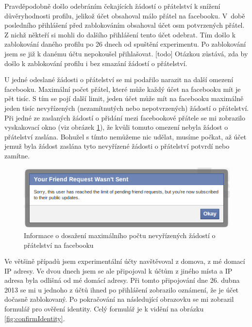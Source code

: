 \documentclass[thesis=M,czech]{FITthesis}[2013/05/10]
\begin{document}
Pravděpodobně došlo odebráním čekajících žádostí o přátelství k snížení důvěryhodnosti profilu, jelikož účet obsahoval málo přátel na facebooku. V~době posledního přihlášení před zablokováním obsahoval účet osm potvrzených přátel. Z nichž někteří si mohli do dalšího přihlášení tento účet odebrat. Tím došlo k zablokování daného profilu po 26 dnech od spuštění experimentu. Po zablokování jsem se již k danému účtu nepokoušel přihlašovat. [todo] Otázkou zůstává, zda by došlo k zablokování profilu i bez smazání žádostí o přátelství.

U jedné odeslané žádosti o přátelství se mi podařilo narazit na další omezení facebooku. Maximální počet přátel, které může každý účet na facebooku mít je pět tisíc. S tím se pojí další limit, jeden účet může mít na facebooku maximálně jeden tisíc nevyřízených (nezamítnutých nebo nepotvrzených) žádostí o přátelství. Při jedné ze zaslaných žádostí o přidání mezi facebookové přátele se mi zobrazilo vyskakovací okno (viz obrázek \ref{fig:friendRequestsLimitReached}), že kvůli tomuto omezení nebyla žádost o přátelství zaslána. Bohužel s tímto nemůžeme nic udělat, musíme počkat, až účet jemuž byla žádost zaslána tyto nevyřízené žádosti o přátelství potvrdí nebo zamítne.

\begin{figure}[h]
\begin{center}
\includegraphics[width=5in]{figures/friendRequestsLimitReached.png}
\caption{Informace o dosažení maximálního počtu nevyřízených žádostí o přátelství na facebooku}
\label{fig:friendRequestsLimitReached}
\end{center}
\end{figure}

Ve většině případů jsem experimentální účty navštěvoval z domova, z mé domací IP adresy. Ve dvou dnech jsem se ale připojoval k účtům z jiného místa a IP adresa byla odlišná od mé domácí adresy. Při tomto připojování dne 26. dubna 2013 se mi u jednoho z účtů ihned po přihlášení zobrazilo oznámení, že je účet dočasně zablokovaný. Po pokračování na následující obrazovku se mi zobrazil formulář pro ověření identity. Celý formulář je k vidění na obrázku \ref{fig:confirmIdentity}.
\end{document}
